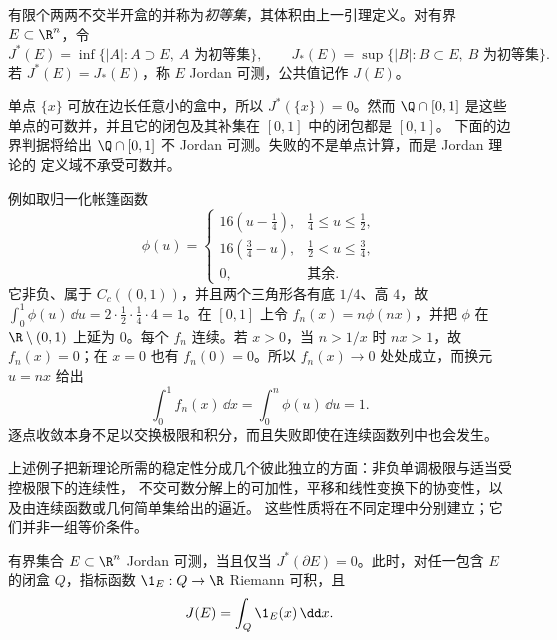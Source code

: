 \begin{definition}\label{def:2-1-1-2}
有限个两两不交半开盒的并称为\emph{初等集}，其体积由上一引理定义。对有界
$E\subset\R^n$，令
\[
 J^*(E)=\inf\{|A|:A\supset E,\ A\text{ 为初等集}\},\qquad
 J_*(E)=\sup\{|B|:B\subset E,\ B\text{ 为初等集}\}.
\]
若 $J^*(E)=J_*(E)$，称 $E$ Jordan 可测，公共值记作 $J(E)$。
\end{definition}

\begin{example}\label{ex:2-1-1-3}
单点 $\{x\}$ 可放在边长任意小的盒中，所以 $J^*(\{x\})=0$。然而
$\Q\cap[0,1]$ 是这些单点的可数并，并且它的闭包及其补集在 $[0,1]$ 中的闭包都是 $[0,1]$。
下面的边界判据将给出 $\Q\cap[0,1]$ 不 Jordan 可测。失败的不是单点计算，而是 Jordan 理论的
定义域不承受可数并。
\end{example}

\begin{example}[移动尖峰]\label{ex:2-1-1-4}
例如取归一化帐篷函数
\[
 \phi(u)=
 \begin{cases}
  16(u-\tfrac14),&\tfrac14\le u\le\tfrac12,\\
  16(\tfrac34-u),&\tfrac12<u\le\tfrac34,\\
  0,&\text{其余}.
 \end{cases}
\]
它非负、属于 $C_c((0,1))$，并且两个三角形各有底 $1/4$、高 $4$，故
$\int_0^1\phi(u)\,\dd u=2\cdot\frac12\cdot\frac14\cdot4=1$。在 $[0,1]$ 上令
$f_n(x)=n\phi(nx)$，并把 $\phi$ 在 $\R\setminus(0,1)$ 上延为 $0$。每个 $f_n$ 连续。若
$x>0$，当 $n>1/x$ 时 $nx>1$，故 $f_n(x)=0$；在 $x=0$ 也有 $f_n(0)=0$。所以
$f_n(x)\to0$ 处处成立，而换元 $u=nx$ 给出
\[
 \int_0^1 f_n(x)\,\dd x=\int_0^n\phi(u)\,\dd u=1.
\]
逐点收敛本身不足以交换极限和积分，而且失败即使在连续函数列中也会发生。
\end{example}

\begin{remark}[可数稳定性的几个侧面]\label{def:2-1-1-3}
上述例子把新理论所需的稳定性分成几个彼此独立的方面：非负单调极限与适当受控极限下的连续性，
不交可数分解上的可加性，平移和线性变换下的协变性，以及由连续函数或几何简单集给出的逼近。
这些性质将在不同定理中分别建立；它们并非一组等价条件。
\end{remark}

\begin{proposition}\label{proposition:2-1-1-2}
有界集合 $E\subset\R^n$ Jordan 可测，当且仅当 $J^*(\partial E)=0$。此时，对任一包含
$E$ 的闭盒 $Q$，指标函数 $\1_E:Q\to\R$ Riemann 可积，且
\[
 J(E)=\int_Q\1_E(x)\,\dd x.
\]
\end{proposition}

